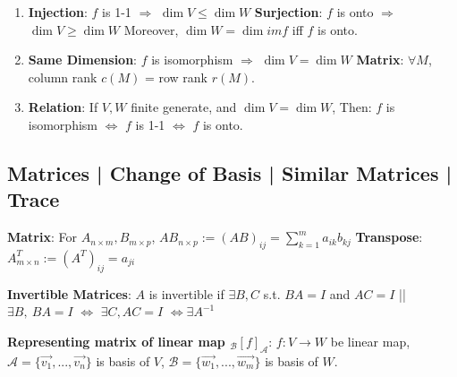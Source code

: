 \documentclass[9pt]{article}
\begin{document}
\begin{enumerate}[itemsep=-2pt, topsep=-2pt]
    \item \textbf{Injection}: $f$ is 1-1 $\Rightarrow$ $\dim V \leq \dim W$ \quad \textbf{Surjection}: $f$ is onto $\Rightarrow$ $\dim V \geq \dim W$ \quad Moreover, $\dim W=\dim imf$ iff $f$ is onto.
    \item \textbf{Same Dimension}: {\small $f$ is isomorphism $\Rightarrow$ $\dim V=\dim W$} \quad \quad \quad \textbf{Matrix}: $\forall M$, column rank $c(M)$ = row rank $r(M)$.
    \item \textbf{Relation}: {\small If $V,W$ finite generate, and $\dim V=\dim W$, \quad Then: $f$ is isomorphism $\Leftrightarrow$ $f$ is 1-1 $\Leftrightarrow$ $f$ is onto.}
\end{enumerate}


\subsection{Matrices | Change of Basis | Similar Matrices | Trace} %

\textbf{Matrix}: For $A_{n\times m},B_{m\times p}$, $AB_{n\times p}:=(AB)_{ij}=\sum_{k=1}^{m}a_{ik}b_{kj}$ \quad \textbf{Transpose}: $A^T_{m\times n}:=(A^T)_{ij}=a_{ji}$

\textbf{Invertible Matrices}: {\small $A$ is invertible if $\exists B,C$ s.t. $BA=I$ and $AC=I$ \quad || \quad $\exists B, \ BA=I$ $\Leftrightarrow$ $\exists C,AC=I$ $\Leftrightarrow \exists A^{-1}$} 

\textbf{Representing matrix of linear map $_{\mathcal{B}}[f]_{\mathcal{A}}$}: $f:V\to W$ be linear map, $\mathcal{A}=\{\vec{v_1},...,\vec{v_n}\}$ is basis of $V$, $\mathcal{B}=\{\vec{w_1},...,\vec{w_m}\}$ is basis of $W$.
\end{document}

